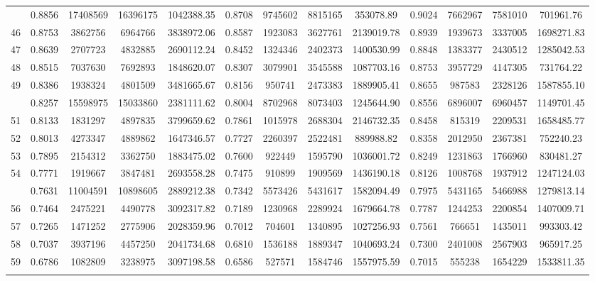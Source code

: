 \documentclass[
  12pt,
]{article}
\begin{document}
\begin{longtable}[t]{lcccccccccccc}
\addlinespace
45 & 0.8856 & 17408569 & 16396175 & 1042388.35 & 0.8708 & 9745602 & 8815165 & 353078.89 & 0.9024 & 7662967 & 7581010 & 701961.76\\
46 & 0.8753 & 3862756 & 6964766 & 3838972.06 & 0.8587 & 1923083 & 3627761 & 2139019.78 & 0.8939 & 1939673 & 3337005 & 1698271.83\\
47 & 0.8639 & 2707723 & 4832885 & 2690112.24 & 0.8452 & 1324346 & 2402373 & 1400530.99 & 0.8848 & 1383377 & 2430512 & 1285042.53\\
48 & 0.8515 & 7037630 & 7692893 & 1848620.07 & 0.8307 & 3079901 & 3545588 & 1087703.16 & 0.8753 & 3957729 & 4147305 & 731764.22\\
49 & 0.8386 & 1938324 & 4801509 & 3481665.67 & 0.8156 & 950741 & 2473383 & 1889905.41 & 0.8655 & 987583 & 2328126 & 1587855.10\\
\addlinespace
50 & 0.8257 & 15598975 & 15033860 & 2381111.62 & 0.8004 & 8702968 & 8073403 & 1245644.90 & 0.8556 & 6896007 & 6960457 & 1149701.45\\
51 & 0.8133 & 1831297 & 4897835 & 3799659.62 & 0.7861 & 1015978 & 2688304 & 2146732.35 & 0.8458 & 815319 & 2209531 & 1658485.77\\
52 & 0.8013 & 4273347 & 4889862 & 1647346.57 & 0.7727 & 2260397 & 2522481 & 889988.82 & 0.8358 & 2012950 & 2367381 & 752240.23\\
53 & 0.7895 & 2154312 & 3362750 & 1883475.02 & 0.7600 & 922449 & 1595790 & 1036001.72 & 0.8249 & 1231863 & 1766960 & 830481.27\\
54 & 0.7771 & 1919667 & 3847481 & 2693558.28 & 0.7475 & 910899 & 1909569 & 1436190.18 & 0.8126 & 1008768 & 1937912 & 1247124.03\\
\addlinespace
55 & 0.7631 & 11004591 & 10898605 & 2889212.38 & 0.7342 & 5573426 & 5431617 & 1582094.49 & 0.7975 & 5431165 & 5466988 & 1279813.14\\
56 & 0.7464 & 2475221 & 4490778 & 3092317.82 & 0.7189 & 1230968 & 2289924 & 1679664.78 & 0.7787 & 1244253 & 2200854 & 1407009.71\\
57 & 0.7265 & 1471252 & 2775906 & 2028359.96 & 0.7012 & 704601 & 1340895 & 1027256.93 & 0.7561 & 766651 & 1435011 & 993303.42\\
58 & 0.7037 & 3937196 & 4457250 & 2041734.68 & 0.6810 & 1536188 & 1889347 & 1040693.24 & 0.7300 & 2401008 & 2567903 & 965917.25\\
59 & 0.6786 & 1082809 & 3238975 & 3097198.58 & 0.6586 & 527571 & 1584746 & 1557975.59 & 0.7015 & 555238 & 1654229 & 1533811.35\\
\addlinespace

\end{longtable}
\end{document}
